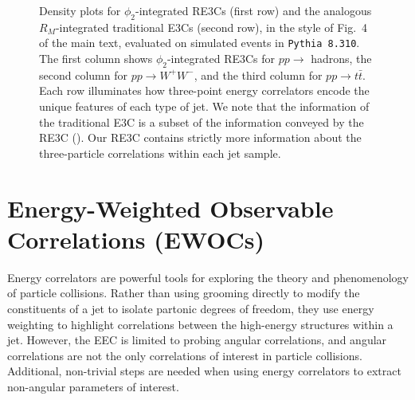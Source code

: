 \begin{figure}[t]
{    }
    \caption[Density plots of azimuthally-integrated resolved three-point energy correlators in QCD, \(W\), and top jets.]{
        Density plots for \(\phi_2\)-integrated RE3Cs (first row) and the analogous \(R_M\)-integrated traditional E3Cs (second row), in the style of Fig.~4 of the main text, evaluated on simulated events in \texttt{Pythia 8.310}.
        The first column shows \(\phi_2\)-integrated RE3Cs for \(p p \to \) hadrons, the second column for \(p p \to W^+ W^-\), and the third column for \(p p \to t \bar t\).
        Each row illuminates how three-point energy correlators encode the unique features of each type of jet.
        We note that the information of the traditional E3C is a subset of the information conveyed by the RE3C ().
        Our RE3C contains strictly more information about the three-particle correlations within each jet sample.
    }
	\label{fig:pythia_densities}%
\end{figure}




\section{Energy-Weighted Observable Correlations (EWOCs)}
\label{sec:ewocs}

Energy correlators are powerful tools for exploring the theory and phenomenology of particle collisions.
%
Rather than using grooming directly to modify the constituents of a jet to isolate partonic degrees of freedom, they use energy weighting to highlight correlations between the high-energy structures within a jet.
%
However, the EEC is limited to probing angular correlations, and angular correlations are not the only correlations of interest in particle collisions.
%
Additional, non-trivial steps are needed when using energy correlators to extract non-angular parameters of interest.

